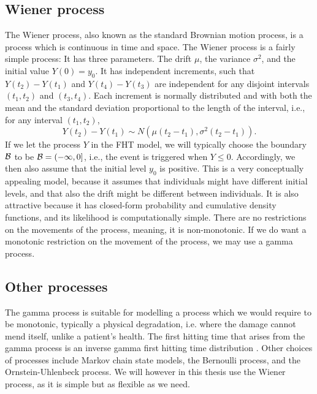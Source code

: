 \subsection{Wiener process}\label{sec:wiener}
The Wiener process, also known as the standard Brownian motion process, is a process which is continuous in time and space. The Wiener process is a fairly simple process: It has three parameters. The drift $\mu$, the variance $\sigma^2$, and the initial value $Y(0)=y_0$. It has independent increments, such that $Y(t_2)-Y(t_1)$ and $Y(t_4)-Y(t_3)$ are independent for any disjoint intervals $(t_1,t_2)$ and $(t_3,t_4)$. Each increment is normally distributed and with both the mean and the standard deviation proportional to the length of the interval, i.e., for any interval $(t_1, t_2)$,
\begin{equation}
    Y(t_2)-Y(t_1)\sim N(\mu(t_2-t_1), \sigma^2(t_2-t_1)).
\end{equation}
If we let the process $Y$ in the FHT model, we will typically choose the boundary $\mathcal{B}$ to be $\mathcal{B}=(-\infty,0]$, i.e., the event is triggered when $Y\leq0$. Accordingly, we then also assume that the initial level $y_0$ is positive. This is a very conceptually appealing model, because it assumes that individuals might have different initial levels, and that also the drift might be different between individuals. It is also attractive because it has closed-form probability and cumulative density functions, and its likelihood is computationally simple. There are no restrictions on the movements of the process, meaning, it is non-monotonic. If we do want a monotonic restriction on the movement of the process, we may use a gamma process.

\subsection{Other processes}
The gamma process is suitable for modelling a process which we would require to be monotonic, typically a physical degradation, i.e. where the damage cannot mend itself, unlike a patient's health. The first hitting time that arises from the gamma process is an inverse gamma first hitting time distribution \citep{leewhitmore2006}. Other choices of processes include Markov chain state models, the Bernoulli process, and the Ornstein-Uhlenbeck process. We will however in this thesis use the Wiener process, as it is simple but as flexible as we need.

